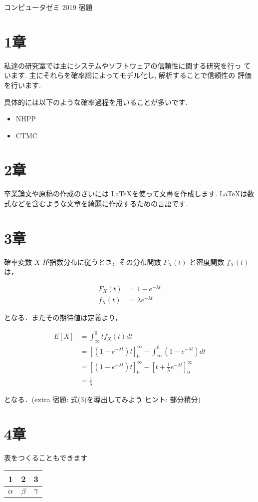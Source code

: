 \documentclass[a4paper,12pt]{article}
\begin{document}
\begin{center}
{\large コンピュータゼミ 2019 宿題}
\end{center}

\section{1章}

私達の研究室では主にシステムやソフトウェアの信頼性に関する研究を行っ
ています. 主にそれらを確率論によってモデル化し, 解析することで信頼性の
評価を行います.

具体的には以下のような確率過程を用いることが多いです.

\begin{itemize}
\item NHPP
\item CTMC
\end{itemize}

\section{2章}

卒業論文や原稿の作成のさいには \LaTeX を使って文書を作成します. \LaTeX は数式などを含むような文章を綺麗に作成するための言語です.

\section{3章}
確率変数 $X$ が指数分布に従うとき，その分布関数 $F_X(t)$ と密度関数 $f_X(t)$は，

\begin{align}
F_X(t) &= 1-e^{-\lambda t} \label{F_X} \\
f_X(t) &= \lambda e^{-\lambda t} \label{f_X}
\end{align}

となる．またその期待値は定義より，

\begin{align}
E[X] &= \int_\infty^0 t f_X(t) dt \nonumber\\
&= [(1-e^{-\lambda t})t]^\infty_0 - \int_\infty^0 (1-e^{-\lambda t}) dt \nonumber\\
&= [(1-e^{-\lambda t})t]^\infty_0 -[t + \frac{1} {\lambda} e^{-\lambda t}]^\infty_0 \nonumber\\
&= \frac{1}{\lambda}
\end{align}

となる．(extra 宿題: 式(3)を導出してみよう ヒント: 部分積分)

\section{4章}

表をつくることもできます
\begin{center}
\begin{tabular}{|c|c|c|}\hline
 1 & 2 & 3 \\\hline
 $\alpha$ & $\beta$ & $\gamma$ \\\hline
\end{tabular}
\end{center}
\end{document}
